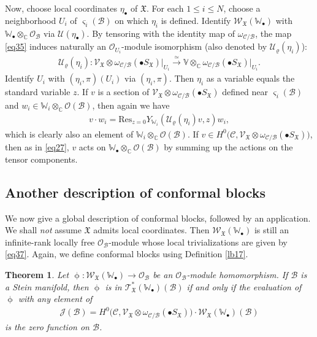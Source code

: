 \documentclass[12pt,a4paper,notitlepage]{article}
\theoremstyle{definition}
\theoremstyle{plain}
\newtheorem{thm}[df]{Theorem}
\newcommand{\fk}{\mathfrak}
\newcommand{\mc}{\mathcal}
\newcommand{\Res}{\mathrm{Res}}
\newcommand{\scr}{\mathscr}
\newcommand{\sgm}{\varsigma}
\newcommand{\SX}{S_{\fk X}}
\newcommand{\blt}{\bullet}
\newcommand{\Vbb}{\mathbb V}
\newcommand{\Wbb}{\mathbb W}
\newcommand{\Cbb}{\mathbb C}
\numberwithin{equation}{section}
\begin{document}
Now, choose local coordinates $\eta_\blt$ of $\fk X$. For each $1\leq i\leq N$, choose a neighborhood $U_i$ of $\sgm_i(\mc B)$ on which $\eta_i$ is defined. Identify $\scr W_{\fk X}(\Wbb_\blt)$ with $\Wbb_\blt\otimes_\Cbb\scr O_{\mc B}$ via $\mc U(\eta_\blt)$. By tensoring with the identity map of $\omega_{\mc C/\mc B}$,  the map \eqref{eq35} induces naturally an $\scr O_{U_i}$-module isomorphism (also denoted by $\mc U_\varrho(\eta_i)$):
\begin{align*}
\mc U_\varrho(\eta_i):\scr V_{\fk X}\otimes\omega_{\mc C/\mc B}(\blt S_{\fk X})\big|_{U_i}\xrightarrow{\simeq}\Vbb\otimes_{\Cbb}\omega_{\mc C/\mc B}(\blt S_{\fk X})\big|_{U_i}.
\end{align*}
Identify $U_i$ with $(\eta_i,\pi)(U_i)$ via $(\eta_i,\pi)$. Then $\eta_i$ as a variable equals the standard variable $z$. If $v$ is a section of $\scr V_{\fk X}\otimes\omega_{\mc C/\mc B}(\blt S_{\fk X})$ defined near $\sgm_i(\mc B)$ and $w_i\in\Wbb_i\otimes_\Cbb\scr O(\mc B)$,  \index{vw@$v\cdot w_i,v\cdot w_\blt$}   then again we have
\begin{align}
v\cdot w_i=\Res_{z=0}Y_{\Wbb_i}(\mc U_\varrho(\eta_i)v,z)w_i,\label{eq55}
\end{align}
which is clearly also an element of $\Wbb_i\otimes_\Cbb\scr O(\mc B)$. If $v\in H^0\big(\mc C,\scr V_{\fk X}\otimes\omega_{\mc C/\mc B}(\blt\SX)\big)$, then as in \eqref{eq27}, $v$ acts on $\Wbb_\blt\otimes_\Cbb\scr O(\mc B)$ by summing up the actions on the tensor components.


\subsection*{Another description of conformal blocks}

We now give a global description of conformal blocks, followed by an application. We shall \emph{not} assume $\fk X$ admits local coordinates. Then $\scr W_{\fk X}(\Wbb_\blt)$ is still an infinite-rank locally free $\scr O_{\mc B}$-module whose local trivializations are given by \eqref{eq37}. Again, we define conformal blocks using Definition \ref{lb17}.


\begin{thm}\label{lb18}
Let $\upphi:\scr W_{\fk X}(\Wbb_\blt)\rightarrow\scr O_{\mc B}$ be an $\scr O_{\mc B}$-module homomorphism. If $\mc B$ is a Stein manifold, then $\upphi$ is in $\scr T_{\fk X}^*(\Wbb_\blt)(\mc B)$ if and only if the  evaluation of $\upphi$ with any element \index{JB@$\scr J(\mc B)$} of 
\begin{align}
\scr J(\mc B)=H^0\big(\mc C,\scr V_{\fk X}\otimes\omega_{\mc C/\mc B}(\blt\SX)\big)\cdot \scr W_{\fk X}(\Wbb_\blt)(\mc B)\label{eq51}
\end{align}
is the zero function on $\mc B$.
\end{thm}
\end{document}
